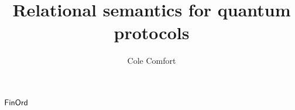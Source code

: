 \documentclass[12pt]{ociamthesis}  %
\title{Relational semantics for quantum protocols}
\author{Cole Comfort}
\begin{document}
\maketitle
%
%
%
%
%
%
%
$\mathsf{FinOrd}$

 

\end{document}

